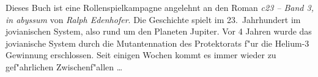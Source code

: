 \begin{summary}
	Dieses Buch ist eine Rollenspielkampagne angelehnt an den Roman \emph{c23 -- Band 3, in abyssum} von \emph{Ralph  Edenhofer}. Die Geschichte spielt im 23.~Jahrhundert im jovianischen System, also rund um den Planeten Jupiter. Vor 4 Jahren wurde das jovianische System durch die Mutantennation des Protektorats f"ur die Helium-3 Gewinnung erschlossen. Seit einigen Wochen kommt es immer wieder zu gef"ahrlichen Zwischenf"allen \dots
\end{summary}

